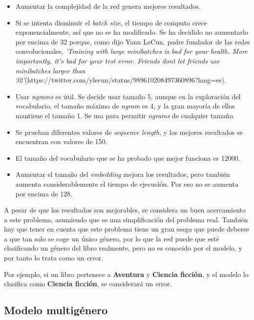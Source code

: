 \documentclass[12pt,a4paper, xcolor=table]{article}
\begin{document}
\begin{itemize}
  \item Aumentar la complejidad de la red genera mejores resultados.
  \item Si se intenta disminuir el \textit{batch size}, el tiempo de computo crece exponencialmente, así que no se ha modificado. Se ha decidido no aumentarlo por encima de 32 porque, como dijo Yann LeCun, padre fundador de las redes convolucionales, \textit{'Training with large minibatches is bad for your health. More importantly, it's bad for your test error. Friends dont let friends use minibatches larger than 32'}(https://twitter.com/ylecun/status/989610208497360896?lang=es).
  \item Usar \textit{ngrams} es útil. Se decide usar tamaño 5, aunque en la exploración del vocabulario, el tamaño máximo de \textit{ngram} es 4, y la gran mayoría de ellos mantiene el tamaño 1. Se usa para permitir \textit{ngrams} de cualquier tamaño.
  \item Se prueban diferentes valores de \textit{sequence length}, y los mejores resultados se encuentran con valores de 150.
  \item El tamaño del vocabulario que se ha probado que mejor funciona es 12000.
  \item Aumentar el tamaño del \textit{embedding} mejora los resultados, pero también aumenta considerablemente el tiempo de ejecución. Por eso no se aumenta por encima de 128.
\end{itemize}

  A pesar de que los resultados son mejorables, se considera un buen acercamiento a este problema, asumiendo que es una simplificación del problema real. También hay que tener en cuenta que este problema tiene un gran sesgo que puede deberse a que tan solo se coge un único género, por lo que la red puede que esté clasificando un género del libro realmente, pero no es conocido por el modelo, y por tanto lo trata como un error.

  \vspace{2mm}

  Por ejemplo, si un libro pertenece a \textbf{Aventura} y \textbf{Ciencia ficción}, y el modelo lo clasifica como \textbf{Ciencia ficción}, se considerará un error.



\subsection{Modelo multigénero}
\end{document}
